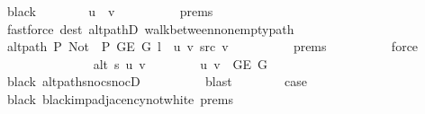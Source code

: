 \begin{isabellebody}
\ black\isanewline
\ \ \ \ \ \ \isamarkupfalse%
\ {\isachardoublequoteopen}u{\isacharprime}{\kern0pt}\ {\isacharequal}{\kern0pt}\ v{\isachardoublequoteclose}\isanewline
\ \ \ \ \ \ \ \ \isamarkupfalse%
\ {\isachardoublequoteopen}{}{\isachardot}{\kern0pt}prems{\isachardoublequoteclose}{\isacharparenleft}{\kern0pt}{}{\isacharparenright}{\kern0pt}\isanewline
\ \ \ \ \ \ \ \ \isamarkupfalse%
\ {\isacharparenleft}{\kern0pt}fastforce\ dest{\isacharcolon}{\kern0pt}\ alt{\isacharunderscore}{\kern0pt}pathD{\isacharparenleft}{\kern0pt}{}{\isacharparenright}{\kern0pt}\ walk{\isacharunderscore}{\kern0pt}between{\isacharunderscore}{\kern0pt}nonempty{\isacharunderscore}{\kern0pt}path{\isacharparenleft}{\kern0pt}{}{\isacharparenright}{\kern0pt}{\isacharparenright}{\kern0pt}\isanewline
\ \ \ \ \ \ \isamarkupfalse%
\ {\isachardoublequoteopen}alt{\isacharunderscore}{\kern0pt}path\ P{\isacharprime}{\kern0pt}{\isacharprime}{\kern0pt}\ {\isacharparenleft}{\kern0pt}Not\ {\isasymcirc}\ P{\isacharprime}{\kern0pt}{\isacharprime}{\kern0pt}{\isacharparenright}{\kern0pt}\ {\isacharparenleft}{\kern0pt}G{\isachardot}{\kern0pt}E\ G{\isacharparenright}{\kern0pt}\ {\isacharparenleft}{\kern0pt}l\ {\isacharat}{\kern0pt}\ {\isacharbrackleft}{\kern0pt}u{\isacharcomma}{\kern0pt}\ v{\isacharbrackright}{\kern0pt}{\isacharparenright}{\kern0pt}\ src\ v{\isachardoublequoteclose}\isanewline
\ \ \ \ \ \ \ \ \isamarkupfalse%
\ {\isachardoublequoteopen}{}{\isachardot}{\kern0pt}prems{\isachardoublequoteclose}{\isacharparenleft}{\kern0pt}{}{\isacharparenright}{\kern0pt}\isanewline
\ \ \ \ \ \ \ \ \isamarkupfalse%
\ force\isanewline
\ \ \ \ \ \ \isamarkupfalse%
\isanewline
\ \ \ \ \ \ \ \ {\isachardoublequoteopen}alt\ s\ u\ v{\isachardoublequoteclose}\isanewline
\ \ \ \ \ \ \ \ {\isachardoublequoteopen}{\isacharbraceleft}{\kern0pt}u{\isacharcomma}{\kern0pt}\ v{\isacharbraceright}{\kern0pt}\ {\isasymin}\ G{\isachardot}{\kern0pt}E\ G{\isachardoublequoteclose}\isanewline
\ \ \ \ \ \ \ \ \isamarkupfalse%
\ black\ alt{\isacharunderscore}{\kern0pt}path{\isacharunderscore}{\kern0pt}snoc{\isacharunderscore}{\kern0pt}snocD\isanewline
\ \ \ \ \ \ \ \ \isamarkupfalse%
\ blast{\isacharplus}{\kern0pt}\isanewline
\ \ \ \ \ \ \isamarkupfalse%
\ {\isacharquery}{\kern0pt}case\isanewline
\ \ \ \ \ \ \ \ \isamarkupfalse%
\ black\ black{\isacharunderscore}{\kern0pt}imp{\isacharunderscore}{\kern0pt}adjacency{\isacharunderscore}{\kern0pt}not{\isacharunderscore}{\kern0pt}white\ {\isachardoublequoteopen}{}{\isachardot}{\kern0pt}prems{\isachardoublequoteclose}{\isacharparenleft}{\kern0pt}{}{\isacharparenright}{\kern0pt}\isanewline

\end{isabellebody}
